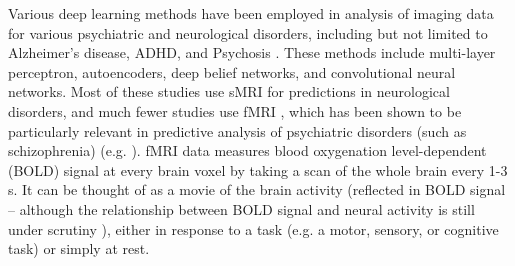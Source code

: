 \documentclass{article}
\begin{document}
Various deep learning methods have been employed in analysis of imaging data for various psychiatric and neurological disorders, including but not limited to Alzheimer’s disease, ADHD, and Psychosis \citep[see][for a review]{Vieira2017}. These methods include multi-layer perceptron, autoencoders, deep belief networks, and convolutional neural networks. Most of these studies use sMRI for predictions in neurological disorders, and much fewer studies use fMRI \citep{Plis2014, Kim2016, Suk2016, Sarraf2016}, which has been shown to be particularly relevant in predictive analysis of psychiatric disorders (such as schizophrenia) (e.g. \citep{Damaraju2014, Calhoun2009}). fMRI data measures blood oxygenation level-dependent (BOLD) signal at every brain voxel by taking a scan of the whole brain every 1-3 s. It can be thought of as a movie of the brain activity (reflected in BOLD signal – although the relationship between BOLD signal and neural activity is still under scrutiny \citep{RN1}), either in response to a task (e.g. a motor, sensory, or cognitive task) or simply at rest.

\end{document}
